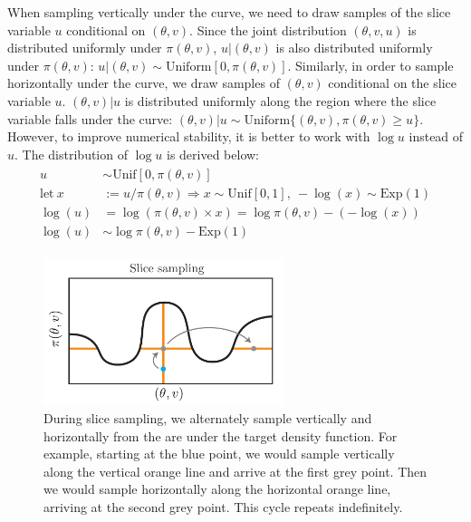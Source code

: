 \documentclass[12pt]{article}
\begin{document}
When sampling vertically under the curve, we need to draw samples of the slice variable $u$ conditional on $(\theta, v)$. Since the joint distribution $(\theta, v, u)$ is distributed uniformly under $\pi(\theta, v)$, $u|(\theta, v)$ is also distributed uniformly under $\pi(\theta, v)$: $u|(\theta, v) \sim \text{Uniform}[0, \pi(\theta, v)]$. Similarly, in order to sample horizontally under the curve, we draw samples of $(\theta, v)$ conditional on the slice variable $u$. $(\theta, v)|u$ is distributed uniformly along the region where the slice variable falls under the curve: $(\theta, v) | u \sim \text{Uniform}\{(\theta, v), \pi(\theta, v) \geq u\}$. However, to improve numerical stability, it is better to work with $\log u$ instead of $u$. The distribution of $\log u$ is derived below:
\begin{align}
\begin{split}
u &\sim \text{Unif}[0, \pi(\theta, v)] \\
\text{let} \ x &:= u/\pi(\theta, v) \Rightarrow x \sim \text{Unif}[0, 1], \  -\log(x) \sim \text{Exp}(1) \\
\log(u) &= \log(\pi(\theta, v) \times x) = \log\pi(\theta, v) - (-\log(x)) \\
\log(u) &\sim \log \pi(\theta, v) - \text{Exp}(1)
\end{split}
\label{eq_logu_distr}
\end{align}

\begin{figure}[H]
\centering
\includegraphics[width=7cm]{illustrations/slice_sampling.pdf}
\caption{During slice sampling, we alternately sample vertically and horizontally from the are under the target density function. For example, starting at the blue point, we would sample vertically along the vertical orange line and arrive at the first grey point. Then we would sample horizontally along the horizontal orange line, arriving at the second grey point. This cycle repeats indefinitely.}
\label{fig_slice_sampling}
\end{figure}
\end{document}
